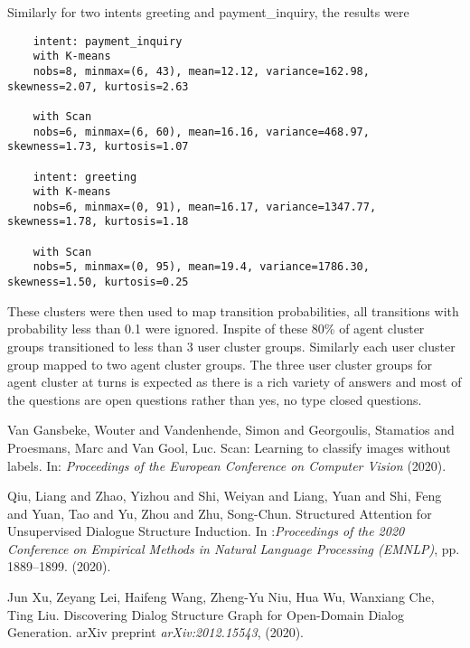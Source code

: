 \documentclass{article}
\begin{document}
Similarly for two intents greeting and payment\_inquiry, the results were

\begin{verbatim}
    intent: payment_inquiry
    with K-means
    nobs=8, minmax=(6, 43), mean=12.12, variance=162.98, skewness=2.07, kurtosis=2.63
    
    with Scan
    nobs=6, minmax=(6, 60), mean=16.16, variance=468.97, skewness=1.73, kurtosis=1.07
    
    intent: greeting 
    with K-means
    nobs=6, minmax=(0, 91), mean=16.17, variance=1347.77, skewness=1.78, kurtosis=1.18
    
    with Scan
    nobs=5, minmax=(0, 95), mean=19.4, variance=1786.30, skewness=1.50, kurtosis=0.25
\end{verbatim}
    
These clusters were then used to map transition probabilities, all transitions with probability less than 0.1 were ignored. Inspite of these 80\% of agent cluster groups transitioned to less than 3 user cluster groups. Similarly each user cluster group mapped to two agent cluster groups. The three user cluster groups for agent cluster at turns is expected as there is a rich variety of answers and most of the questions are open questions rather than yes, no type closed questions.



 
\begin{thebibliography}{1}
    \newblock Van Gansbeke, Wouter and Vandenhende, Simon and Georgoulis, Stamatios and Proesmans, Marc and Van Gool, Luc. Scan: Learning to classify images without labels. 
    \newblock In: {\em Proceedings of the European Conference on Computer Vision} (2020).
	


	\newblock Qiu, Liang  and Zhao, Yizhou  and Shi, Weiyan  and Liang, Yuan  and      Shi, Feng  and Yuan, Tao  and Yu, Zhou  and Zhu, Song-Chun. Structured Attention for Unsupervised Dialogue Structure Induction.
	\newblock In :{\em Proceedings of the 2020 Conference on Empirical Methods in Natural Language Processing (EMNLP)}, pp. 1889--1899.  (2020).

	\newblock Jun Xu, Zeyang Lei, Haifeng Wang, Zheng-Yu Niu, Hua Wu, Wanxiang Che, Ting Liu. Discovering Dialog Structure Graph for Open-Domain Dialog Generation.
	\newblock arXiv preprint {\em arXiv:2012.15543}, (2020).

\end{thebibliography}
\end{document}
